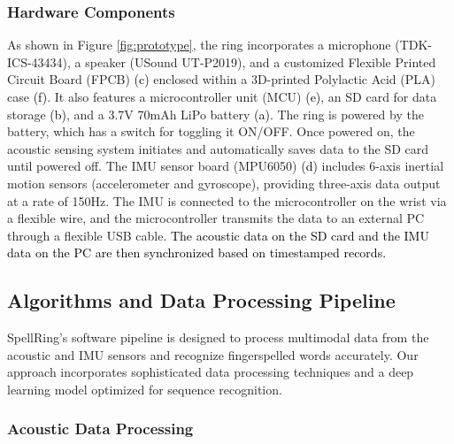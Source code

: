 \subsubsection{Hardware Components}
As shown in Figure \ref{fig:prototype}, the ring incorporates a microphone (TDK-ICS-43434), a speaker (USound UT-P2019), and a customized Flexible Printed Circuit Board (FPCB) \textcolor{black}{(c)} enclosed within a 3D-printed Polylactic Acid (PLA) case \textcolor{black}{(f)}. It also features a microcontroller unit (MCU) \textcolor{black}{(e)}, an SD card for data storage \textcolor{black}{(b)}, and a 3.7V 70mAh LiPo battery \textcolor{black}{(a)}. The ring is powered by the battery, which has a switch for toggling it ON/OFF. Once powered on, the acoustic sensing system initiates and automatically saves data to the SD card until powered off. The IMU sensor board (MPU6050) \textcolor{black}{(d)} includes 6-axis inertial motion sensors (accelerometer and gyroscope), providing three-axis data output at a rate of 150Hz. The IMU is connected to the microcontroller on the wrist via a flexible wire, and the microcontroller transmits the data to an external PC through a flexible USB cable. \textcolor{black}{The acoustic data on the SD card and the IMU data on the PC are then synchronized based on timestamped records.}







\subsection{Algorithms and Data Processing Pipeline}
SpellRing's software pipeline is designed to process multimodal data from the acoustic and IMU sensors and recognize fingerspelled words accurately. Our approach incorporates sophisticated data processing techniques and a deep learning model optimized for sequence recognition.

\subsubsection{Acoustic Data Processing}

